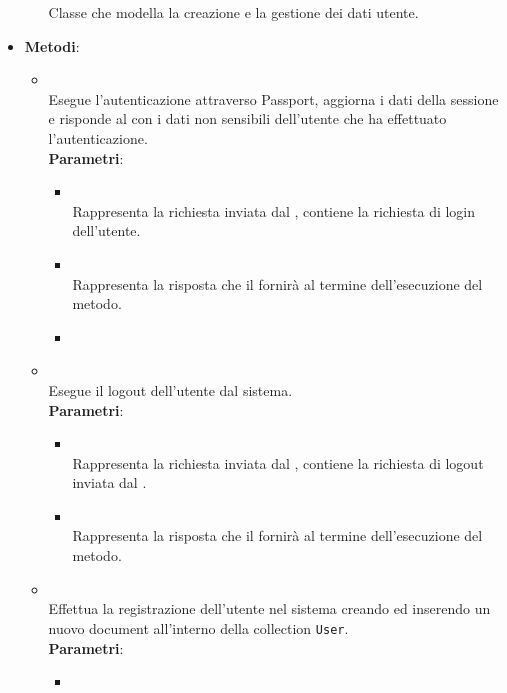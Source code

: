 \begin{itemize}
\begin{itemize}
Classe che modella la creazione e la gestione dei dati utente.
\end{itemize}
\item \textbf{Metodi}:
\begin{itemize}
\item {}
\\ Esegue l'autenticazione attraverso Passport, aggiorna i dati della sessione e risponde al  con i dati non sensibili dell'utente che ha effettuato l'autenticazione.
\\ \textbf{Parametri}:
\begin{itemize}
\item {}
\\ Rappresenta la richiesta inviata dal , contiene la richiesta di login dell’utente.
\item {}
\\ Rappresenta la risposta che il  fornirà al termine dell’esecuzione del metodo.
\item {}
\\ \dpNext
\end{itemize}
\item {}
\\ Esegue il logout dell'utente dal sistema.
\\ \textbf{Parametri}:
\begin{itemize}
\item {}
\\ Rappresenta la richiesta inviata dal , contiene la richiesta di logout inviata dal .
\item {}
\\ Rappresenta la risposta che il  fornirà al termine dell’esecuzione del metodo.
\end{itemize}
\item {}
\\ Effettua la registrazione dell’utente nel sistema creando ed inserendo un nuovo document all’interno della collection \texttt{User}.
\\ \textbf{Parametri}:
\begin{itemize}
\item {}

\end{itemize}
\end{itemize}
\end{itemize}
